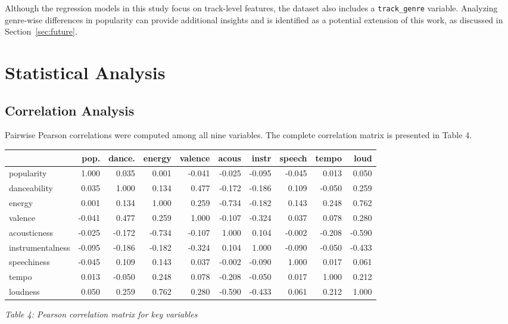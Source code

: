 \documentclass[12pt,a4paper]{article}
\begin{document}
Although the regression models in this study focus on track-level
features, the dataset also includes a \texttt{track\_genre} variable.
Analyzing genre-wise differences in popularity can provide additional
insights and is identified as a potential extension of this work, as
discussed in Section~\ref{sec:future}.
\section{Statistical Analysis}

\subsection{Correlation Analysis}

Pairwise Pearson correlations were computed among all nine variables.
The complete correlation matrix is presented in Table 4.

\begin{table}[H]
\centering
\small
\renewcommand{\arraystretch}{1.2}

\begin{tabular}{lrrrrrrrrr}
\toprule
 & pop. & dance. & energy & valence & acous & instr & speech & tempo & loud \\
\midrule
popularity       & 1.000 & 0.035 & 0.001 & -0.041 & -0.025 & -0.095 & -0.045 & 0.013 & 0.050 \\
danceability     & 0.035 & 1.000 & 0.134 & 0.477 & -0.172 & -0.186 & 0.109 & -0.050 & 0.259 \\
energy           & 0.001 & 0.134 & 1.000 & 0.259 & -0.734 & -0.182 & 0.143 & 0.248 & 0.762 \\
valence          & -0.041 & 0.477 & 0.259 & 1.000 & -0.107 & -0.324 & 0.037 & 0.078 & 0.280 \\
acousticness     & -0.025 & -0.172 & -0.734 & -0.107 & 1.000 & 0.104 & -0.002 & -0.208 & -0.590 \\
instrumentalness & -0.095 & -0.186 & -0.182 & -0.324 & 0.104 & 1.000 & -0.090 & -0.050 & -0.433 \\
speechiness      & -0.045 & 0.109 & 0.143 & 0.037 & -0.002 & -0.090 & 1.000 & 0.017 & 0.061 \\
tempo            & 0.013 & -0.050 & 0.248 & 0.078 & -0.208 & -0.050 & 0.017 & 1.000 & 0.212 \\
loudness         & 0.050 & 0.259 & 0.762 & 0.280 & -0.590 & -0.433 & 0.061 & 0.212 & 1.000 \\
\bottomrule
\end{tabular}

\vspace{0.4em}
\begin{center}
\textit{Table 4: Pearson correlation matrix for key variables}
\end{center}

\end{table}
\end{document}
